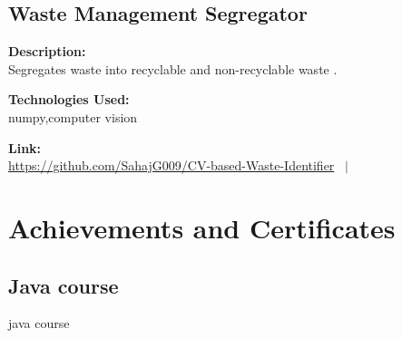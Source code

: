 \documentclass[a4paper,10pt]{article}
\begin{document}
\subsection*{Waste Management Segregator}

\noindent
\begin{minipage}[t]{0.4\textwidth}
  \textbf{Description:}\\
  Segregates waste into recyclable and non-recyclable waste .
\end{minipage}%
\begin{minipage}[t]{0.4\textwidth}
  \textbf{Technologies Used:}\\
  numpy,computer vision
\end{minipage}%
\begin{minipage}[t]{0.2\textwidth}
  \textbf{Link:}\\
  \url{https://github.com/SahajG009/CV-based-Waste-Identifier} \ $|$
\end{minipage}







\section{Achievements and Certificates}

\subsection*{Java course}

\begin{multicols}{2}
    \begin{itemize}
        \Completed java course
    \end{itemize}
    
    \columnbreak
\end{multicols}
\end{document}
